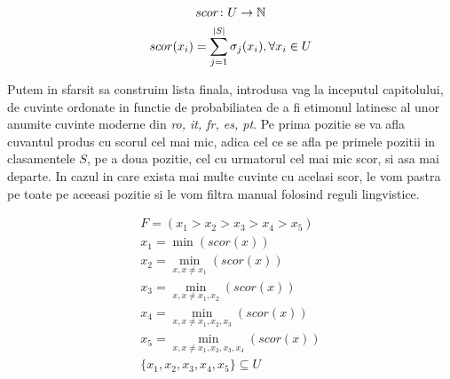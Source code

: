 \begin{gather*}
  scor \colon U \to \mathbb{N} \\
  scor(x_i) = \smashoperator{\sum_{j=1}^{|S|}} \sigma_j(x_i), \forall x_i \in U
\end{gather*}

Putem in sfarsit sa construim lista finala, introdusa vag la inceputul capitolului, de cuvinte 
ordonate in functie de probabiliatea de a  fi etimonul latinesc al unor anumite cuvinte moderne 
din \textit{ro, it, fr, es, pt}. Pe prima pozitie se va afla cuvantul produs cu scorul cel mai mic,
adica cel ce se afla pe primele pozitii in clasamentele $S$, pe a doua pozitie, cel cu urmatorul cel
mai mic scor, si asa mai departe. In cazul in care exista mai multe cuvinte cu acelasi scor, le 
vom pastra pe toate pe aceeasi pozitie si le vom filtra manual folosind reguli lingvistice.

\begin{gather*}
  F = (x_1 > x_2 > x_3 > x_4 > x_5) \\
  x_1 = \min (scor(x)) \\
  x_2 = \min_{x, x \neq x_1} (scor(x)) \\
  x_3 = \min_{x, x \neq x_1, x_2} (scor(x)) \\
  x_4 = \min_{x, x \neq x_1, x_2, x_3} (scor(x)) \\
  x_5 = \min_{x, x \neq x_1, x_2, x_3, x_4} (scor(x)) \\
  \{x_1, x_2, x_3, x_4, x_5\} \subseteq U
\end{gather*}

